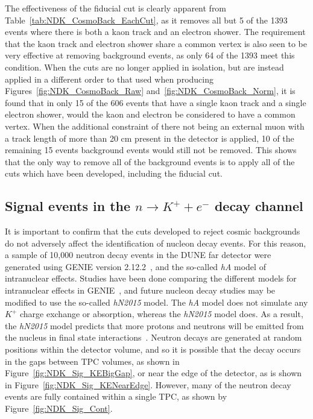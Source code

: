 The effectiveness of the fiducial cut is clearly apparent from Table~\ref{tab:NDK_CosmoBack_EachCut}, as it removes all but 5 of the 1393 events where there is both a kaon track and an electron shower. The requirement that the kaon track and electron shower share a common vertex is also seen to be very effective at removing background events, as only 64 of the 1393 meet this condition. When the cuts are no longer applied in isolation, but are instead applied in a different order to that used when producing Figures~\ref{fig:NDK_CosmoBack_Raw} and~\ref{fig:NDK_CosmoBack_Norm}, it is found that in only 15 of the 606 events that have a single kaon track and a single electron shower, would the kaon and electron be considered to have a common vertex. When the additional constraint of there not being an external muon with a track length of more than 20 cm present in the detector is applied, 10 of the remaining 15 events background events would still not be removed. This shows that the only way to remove all of the background events is to apply all of the cuts which have been developed, including the fiducial cut. \\

\subsection{Signal events in the $n \rightarrow K^{+} + e^{-}$ decay channel} \label{sec:NDKSig}
It is important to confirm that the cuts developed to reject cosmic backgrounds do not adversely affect the identification of nucleon decay events. For this reason, a sample of 10,000 neutron decay events in the DUNE far detector were generated using GENIE version 2.12.2~\citep{GENIE}, and the so-called \emph{hA} model of intranuclear effects. Studies have been done comparing the different models for intranuclear effects in GENIE~\citep{FDTFMarch2017}, and future nucleon decay studies may be modified to use the so-called \emph{hN2015} model. The \emph{hA} model does not simulate any $K^+$ charge exchange or absorption, whereas the \emph{hN2015} model does. As a result, the \emph{hN2015} model predicts that more protons and neutrons will be emitted from the nucleus in final state interactions~\citep{FDTFMarch2017}. Neutron decays are generated at random positions within the detector volume, and so it is possible that the decay occurs in the gaps between TPC volumes, as shown in Figure~\ref{fig:NDK_Sig_KEBigGap}, or near the edge of the detector, as is shown in Figure~\ref{fig:NDK_Sig_KENearEdge}. However, many of the neutron decay events are fully contained within a single TPC, as shown by Figure~\ref{fig:NDK_Sig_Cont}. \\

